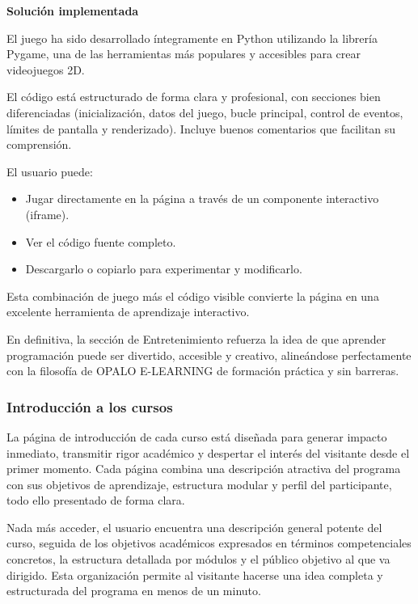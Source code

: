 \documentclass[11.5pt]{article}
\begin{document}
	\noindent\textbf{{\large Solución implementada}}
	
	El juego ha sido desarrollado íntegramente en Python utilizando la librería Pygame, una de las herramientas más populares y accesibles para crear videojuegos 2D.
	
	El código está estructurado de forma clara y profesional, con secciones bien diferenciadas (inicialización, datos del juego, bucle principal, control de eventos, límites de pantalla y renderizado). Incluye buenos comentarios que facilitan su comprensión.
	
	El usuario puede:
	
	\begin{itemize}
		\item Jugar directamente en la página a través de un componente interactivo (iframe).
		\item 	Ver el código fuente completo.
		\item 	Descargarlo o copiarlo para experimentar y modificarlo.
	\end{itemize}
	
	Esta combinación de juego más el código visible convierte la página en una excelente herramienta de aprendizaje interactivo.
	
	En definitiva, la sección de Entretenimiento refuerza la idea de que aprender programación puede ser divertido, accesible y creativo, alineándose perfectamente con la filosofía de OPALO E-LEARNING de formación práctica y sin barreras.
	
	\subsubsection{Introducción a los cursos}
	
	La página de introducción de cada curso está diseñada para generar impacto inmediato, transmitir rigor académico y despertar el interés del visitante desde el primer momento. Cada página combina una descripción atractiva del programa con sus objetivos de aprendizaje, estructura modular y perfil del participante, todo ello presentado de forma clara.

	Nada más acceder, el usuario encuentra una descripción general potente del curso, seguida de los objetivos académicos expresados en términos competenciales concretos, la estructura detallada por módulos y el público objetivo al que va dirigido. Esta organización permite al visitante hacerse una idea completa y estructurada del programa en menos de un minuto.
\end{document}
